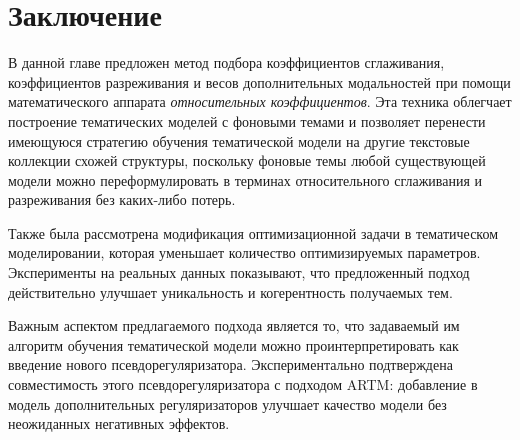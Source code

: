\section{Заключение}

В данной главе предложен метод подбора коэффициентов сглаживания, коэффициентов разреживания и весов дополнительных модальностей при помощи математического аппарата \textit{относительных коэффициентов}. Эта техника облегчает построение тематических моделей с фоновыми темами и позволяет перенести имеющуюся стратегию обучения тематической модели на другие текстовые коллекции схожей структуры, поскольку фоновые темы любой существующей модели можно переформулировать в терминах относительного сглаживания и разреживания без каких-либо потерь.

Также была рассмотрена модификация оптимизационной задачи в тематическом моделировании, которая уменьшает количество оптимизируемых параметров. Эксперименты на реальных данных показывают, что предложенный подход действительно улучшает уникальность и когерентность получаемых тем.

Важным аспектом предлагаемого подхода является то, что задаваемый им алгоритм обучения тематической модели можно проинтерпретировать как введение нового псевдорегуляризатора. Экспериментально подтверждена совместимость этого псевдорегуляризатора с подходом ARTM: добавление в модель дополнительных регуляризаторов улучшает качество модели без неожиданных негативных эффектов.
